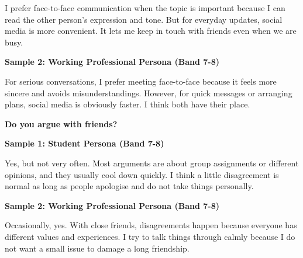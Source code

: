 I prefer face-to-face communication when the topic is important because I can read the other person's expression and tone. But for everyday updates, social media is more convenient. It lets me keep in touch with friends even when we are busy.

\textbf{Sample 2: Working Professional Persona (Band 7-8)}

For serious conversations, I prefer meeting face-to-face because it feels more sincere and avoids misunderstandings. However, for quick messages or arranging plans, social media is obviously faster. I think both have their place.

\separator

\begin{ieltsquestion}
\textbf{Do you argue with friends?}
\end{ieltsquestion}
\textbf{Sample 1: Student Persona (Band 7-8)}

Yes, but not very often. Most arguments are about group assignments or different opinions, and they usually cool down quickly. I think a little disagreement is normal as long as people apologise and do not take things personally.

\textbf{Sample 2: Working Professional Persona (Band 7-8)}

Occasionally, yes. With close friends, disagreements happen because everyone has different values and experiences. I try to talk things through calmly because I do not want a small issue to damage a long friendship.

\separator


